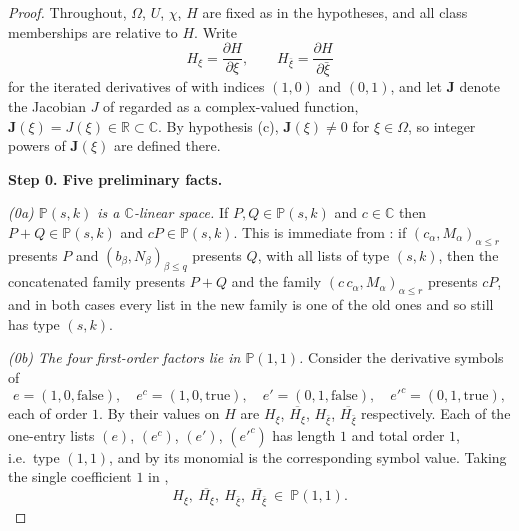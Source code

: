 \begin{proof}
Throughout, $\Omega$, $U$, $\chi$, $H$ are fixed as in the hypotheses, and all
class memberships are relative to $H$.  Write
\[
  H_\xi=\frac{\partial H}{\partial\xi},\qquad
  H_{\bar\xi}=\frac{\partial H}{\partial\bar\xi}
\]
for the iterated derivatives of  with indices $(1,0)$
and $(0,1)$, and let $\mathbf{J}$ denote the Jacobian $J$ of 
regarded as a complex-valued function, $\mathbf{J}(\xi)=J(\xi)\in\mathbb{R}
\subset\mathbb{C}$.  By hypothesis (c), $\mathbf{J}(\xi)\neq0$ for
$\xi\in\Omega$, so integer powers of $\mathbf{J}(\xi)$ are defined there.

\medskip
\noindent\textbf{Step 0.  Five preliminary facts.}

\emph{(0a) $\mathbb{P}(s,k)$ is a $\mathbb{C}$-linear space.}  If
$P,Q\in\mathbb{P}(s,k)$ and $c\in\mathbb{C}$ then $P+Q\in\mathbb{P}(s,k)$ and
$cP\in\mathbb{P}(s,k)$.  This is immediate from : if
$(c_\alpha,M_\alpha)_{\alpha\le r}$ presents $P$ and $(b_\beta,N_\beta)_{\beta\le q}$
presents $Q$, with all lists of type $(s,k)$, then the concatenated family
presents $P+Q$ and the family $(c\,c_\alpha,M_\alpha)_{\alpha\le r}$ presents
$cP$, and in both cases every list in the new family is one of the old ones and
so still has type $(s,k)$.

\emph{(0b) The four first-order factors lie in $\mathbb{P}(1,1)$.}  Consider
the derivative symbols of 
\[
  e=(1,0,\text{false}),\quad e^{c}=(1,0,\text{true}),\quad
  e'=(0,1,\text{false}),\quad e'^{c}=(0,1,\text{true}),
\]
each of order $1$.  By  their values on $H$ are
$H_\xi$, $\overline{H_\xi}$, $H_{\bar\xi}$, $\overline{H_{\bar\xi}}$
respectively.  Each of the one-entry lists $(e)$, $(e^{c})$, $(e')$,
$(e'^{c})$ has length $1$ and total order $1$, i.e.\ type $(1,1)$, and by
 its monomial is the corresponding symbol value.  Taking
the single coefficient $1$ in ,
\[
  H_\xi,\ \overline{H_\xi},\ H_{\bar\xi},\ \overline{H_{\bar\xi}}\ \in\ \mathbb{P}(1,1).
\]


\end{proof}
